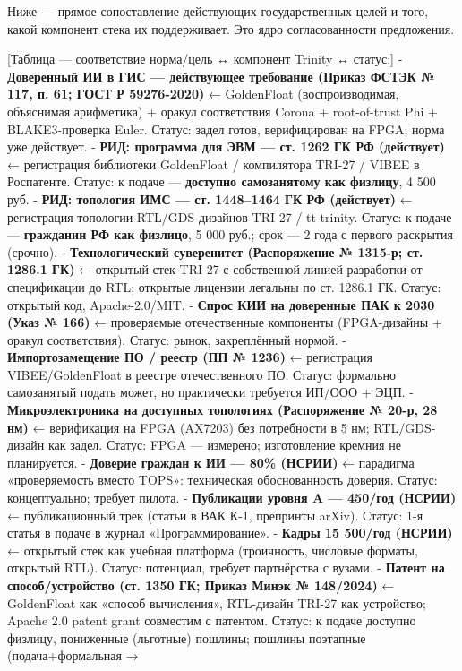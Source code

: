 \documentclass[
  russian,
]{article}
\begin{document}
Ниже --- прямое сопоставление действующих государственных целей и того,
какой компонент стека их поддерживает. Это ядро согласованности
предложения.

{[}Таблица --- соответствие норма/цель ↔ компонент Trinity ↔ статус:{]}
- \textbf{Доверенный ИИ в ГИС --- действующее требование (Приказ ФСТЭК №
117, п. 61; ГОСТ Р 59276-2020)} ← GoldenFloat (воспроизводимая,
объяснимая арифметика) + оракул соответствия Corona + root-of-trust Phi
+ BLAKE3-проверка Euler. Статус: задел готов, верифицирован на FPGA;
норма уже действует. - \textbf{РИД: программа для ЭВМ --- ст. 1262 ГК РФ
(действует)} ← регистрация библиотеки GoldenFloat / компилятора TRI-27 /
VIBEE в Роспатенте. Статус: к подаче --- \textbf{доступно самозанятому
как физлицу}, 4 500 руб. - \textbf{РИД: топология ИМС --- ст. 1448--1464
ГК РФ (действует)} ← регистрация топологии RTL/GDS-дизайнов TRI-27 / tt-trinity.
Статус: к подаче --- \textbf{гражданин РФ как физлицо}, 5 000 руб.; срок
--- 2 года с первого раскрытия (срочно). - \textbf{Технологический
суверенитет (Распоряжение № 1315-р; ст. 1286.1 ГК)} ← открытый стек
TRI-27 с собственной линией разработки от спецификации до RTL; открытые
лицензии легальны по ст. 1286.1 ГК. Статус: открытый код,
Apache-2.0/MIT. - \textbf{Спрос КИИ на доверенные ПАК к 2030 (Указ №
166)} ← проверяемые отечественные компоненты (FPGA-дизайны + оракул
соответствия). Статус: рынок, закреплённый нормой. -
\textbf{Импортозамещение ПО / реестр (ПП № 1236)} ← регистрация
VIBEE/GoldenFloat в реестре отечественного ПО. Статус: формально
самозанятый подать может, но практически требуется ИП/ООО + ЭЦП. -
\textbf{Микроэлектроника на доступных топологиях (Распоряжение № 20-р,
28 нм)} ← верификация на FPGA (AX7203) без
потребности в 5 нм; RTL/GDS-дизайн как задел. Статус: FPGA --- измерено; изготовление
кремния не планируется. - \textbf{Доверие граждан к ИИ --- 80\% (НСРИИ)} ←
парадигма «проверяемость вместо TOPS»: техническая обоснованность
доверия. Статус: концептуально; требует пилота. - \textbf{Публикации
уровня A --- 450/год (НСРИИ)} ← публикационный трек (статьи в ВАК К-1,
препринты arXiv). Статус: 1-я статья в подаче в журнал
«Программирование». - \textbf{Кадры 15 500/год (НСРИИ)} ← открытый стек
как учебная платформа (троичность, числовые форматы, открытый RTL).
Статус: потенциал, требует партнёрства с вузами. - \textbf{Патент на
способ/устройство (ст. 1350 ГК; Приказ Минэк № 148/2024)} ← GoldenFloat
как «способ вычисления», RTL-дизайн TRI-27 как устройство; Apache 2.0 patent
grant совместим с патентом. Статус: к подаче доступно физлицу,
пониженные (льготные) пошлины; пошлины поэтапные (подача+формальная →
\end{document}
